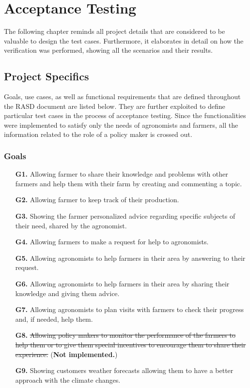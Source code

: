 \chapter{Acceptance Testing} \label{ch:acceptance_testing}

The following chapter reminds all project details that are considered to be valuable to design the test cases. Furthermore, it elaborates in detail on how the verification was performed, showing all the scenarios and their results.

\section{Project Specifics}

Goals, use cases, as well as functional requirements that are defined throughout the RASD document are listed below. They are further exploited to define particular test cases in the process of acceptance testing. Since the functionalities were implemented to satisfy only the needs of agronomists and farmers, all the information related to the role of a policy maker is crossed out.

\subsection{Goals}

\begin{enumerate}
	\item [\textbf{G1.}] Allowing farmer to share their knowledge and problems with other farmers and help them with their farm by creating and commenting a topic.
	\item [\textbf{G2.}] Allowing farmer to keep track of their production.
	\item [\textbf{G3.}] Showing the farmer personalized advice regarding specific subjects of their need, shared by the agronomist.
	\item [\textbf{G4.}] Allowing farmers to make a request for help to agronomists.
	\item [\textbf{G5.}] Allowing agronomists to help farmers in their area by answering to their request.
	\item [\textbf{G6.}] Allowing agronomists to help farmers in their area by sharing their knowledge and giving them advice.
	\item [\textbf{G7.}] Allowing agronomists to plan visits with farmers to check their progress and, if needed, help them.
	\item [\textbf{G8.}] \sout{Allowing policy makers to monitor the performance of the farmers to help them or to give them special incentives to encourage them to share their experience.} (\textbf{Not implemented.})
	\item [\textbf{G9.}] Showing customers weather forecasts allowing them to have a better approach with the climate changes.
\end{enumerate}

